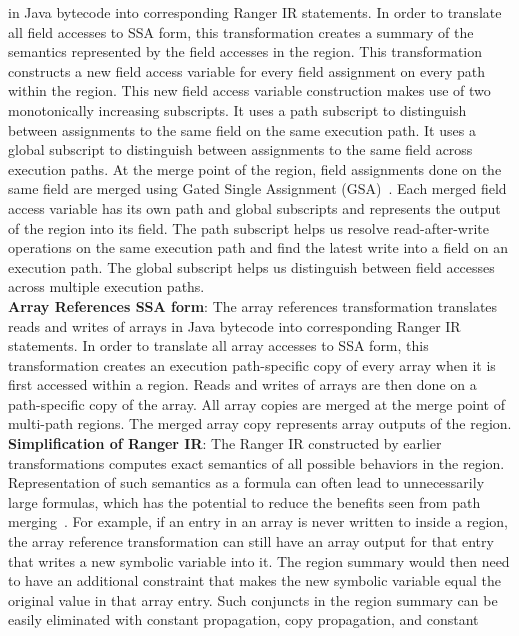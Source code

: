 in Java bytecode into corresponding Ranger IR statements.
%
In order to translate all field accesses to SSA form, this transformation creates a summary of the semantics
represented by the field accesses in the region.
%
This transformation constructs a new field access variable for every field assignment on every path within the region.
%
This new field access variable construction makes use of two monotonically increasing subscripts.
%
It uses a path subscript to distinguish between assignments to the same field on the same execution path.
%
It uses a global subscript to distinguish between assignments to the same field across execution paths.
%
At the merge point of the region, field assignments done on the same field are merged using
Gated Single Assignment (GSA)~\cite{Ottenstein1990}.
%
Each merged field access variable has its own path and global subscripts and represents the output of the region into
its field.
%
The path subscript helps us resolve read-after-write operations on the same execution path and find the latest write
into a field on an execution path.
%
The global subscript helps us distinguish between field accesses across multiple execution paths. \\
\textbf{Array References SSA form}: The array references transformation translates reads and writes of arrays in
Java bytecode into corresponding Ranger IR statements.
%
In order to translate all array accesses to SSA form, this transformation creates an execution path-specific copy of
every array when it is first accessed within a region.
%
Reads and writes of arrays are then done on a path-specific copy of the array.
%
All array copies are merged at the merge point of multi-path regions.
%
The merged array copy represents array outputs of the region.\\
\textbf{Simplification of Ranger IR}: The Ranger IR constructed by earlier transformations computes exact semantics
of all possible behaviors in the region.
%
Representation of such semantics as a formula can often lead to unnecessarily large formulas, which has the potential to
reduce the benefits seen from path merging~\cite{angr}.
%
For example, if an entry in an array is never written to inside a region, the array reference transformation can still have an
array output for that entry that writes a new symbolic variable into it.
%
The region summary would then need to have an additional constraint that makes the new symbolic variable equal the
original value in that array entry.
%
Such conjuncts in the region summary can be easily eliminated with constant propagation, copy propagation, and constant
